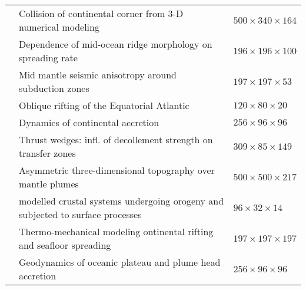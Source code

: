 {\begin{tabular}{lll}
\cite{lixg13} & Collision of continental corner from 3-D numerical modeling                     & $500 \times 340 \times 164$ \\%
\cite{puge14} & Dependence of mid-ocean ridge morphology on spreading rate                      & $196\times196\times100$ \\%
\cite{facc14} & Mid mantle seismic anisotropy around subduction zones                           & $197\times197\times53$ \\%
\cite{hebr14} & Oblique rifting of the Equatorial Atlantic                                      & $120\times80\times20$ \\%
\cite{mobm14} & Dynamics of continental accretion                                               & $256\times96\times96$ \\
\cite{rugb14} & Thrust wedges: infl. of decollement strength on transfer zones                  & $309\times85\times149$\\
\cite{buge14} & Asymmetric three-dimensional topography over mantle plumes                      & $500\times500\times217$ \\
\cite{thsh14} & modelled crustal systems undergoing orogeny and subjected to surface processes  & $96\times32\times14$\\
\cite{lige14b}& Thermo-mechanical modeling ontinental rifting and seafloor spreading            & $197\times197\times197$  \\ 
\cite{bemm15} & Geodynamics of oceanic plateau and plume head accretion                         & $256\times96\times96$ \\
\hline
\end{tabular}
}


